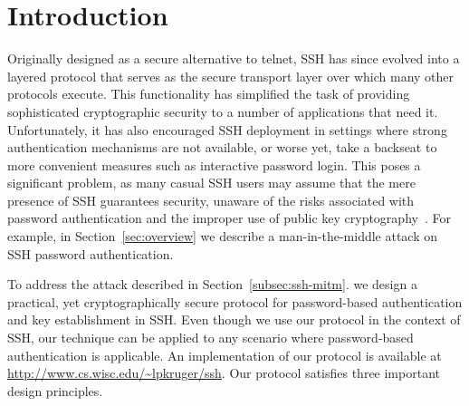 \section{Introduction}
\label{sec:intro}


Originally designed as a secure alternative to telnet, SSH has since
evolved into a layered protocol that serves as the secure transport
layer over which many other protocols execute. This functionality has
simplified the task of providing sophisticated cryptographic security
to a number of applications that need it. Unfortunately, it has also
encouraged SSH deployment in settings where strong authentication
mechanisms are not available, or worse yet, take a backseat to more
convenient measures such as interactive password login. This poses a
significant problem, as many casual SSH users may assume that the mere
presence of SSH guarantees security, unaware of the risks associated
with password authentication and the improper use of public key
cryptography~\cite{DBLP:journals/compsec/YangS99}. For example, in
Section~\ref{sec:overview} we describe a man-in-the-middle attack on
SSH password authentication.

\vspace{1ex}
\noindent
To address the attack described in Section~\ref{subsec:ssh-mitm}.  we
design a practical, yet cryptographically secure protocol for
password-based authentication and key establishment in SSH.  Even though
we use our protocol in the context of SSH, our technique can be applied 
to any scenario where password-based authentication is applicable. An
implementation of our protocol is available at \url{http://www.cs.wisc.edu/~lpkruger/ssh}. Our protocol
satisfies three important design principles.

